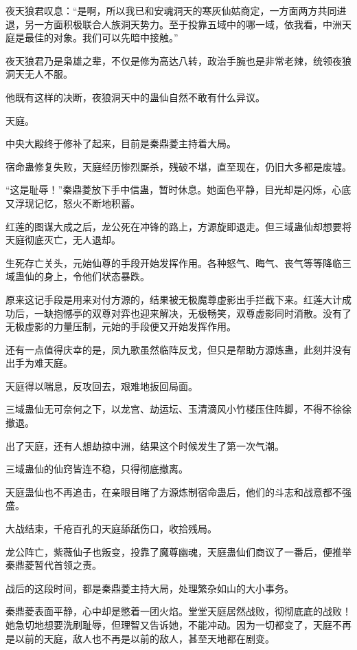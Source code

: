 \begin{this_body}
夜天狼君叹息：“是啊，所以我已和安魂洞天的寒灰仙姑商定，一方面两方共同进退，另一方面积极联合人族洞天势力。至于投靠五域中的哪一域，依我看，中洲天庭是最佳的对象。我们可以先暗中接触。”

夜天狼君乃是枭雄之辈，不仅是修为高达八转，政治手腕也是非常老辣，统领夜狼洞天无人不服。

他既有这样的决断，夜狼洞天中的蛊仙自然不敢有什么异议。

天庭。

中央大殿终于修补了起来，目前是秦鼎菱主持着大局。

宿命蛊修复失败，天庭经历惨烈厮杀，残破不堪，直至现在，仍旧大多都是废墟。

“这是耻辱！”秦鼎菱放下手中信蛊，暂时休息。她面色平静，目光却是闪烁，心底又浮现记忆，怒火不断地积蓄。

红莲的图谋大成之后，龙公死在冲锋的路上，方源旋即退走。但三域蛊仙却想要将天庭彻底灭亡，无人退却。

生死存亡关头，元始仙尊的手段开始发挥作用。各种怒气、晦气、丧气等等降临三域蛊仙的身上，令他们状态暴跌。

原来这记手段是用来对付方源的，结果被无极魔尊虚影出手拦截下来。红莲大计成功后，一缺抱憾亭的双尊对弈也迎来解决，无极畅笑，双尊虚影同时消散。没有了无极虚影的力量压制，元始的手段便又开始发挥作用。

还有一点值得庆幸的是，凤九歌虽然临阵反戈，但只是帮助方源炼蛊，此刻并没有出手为难天庭。

天庭得以喘息，反攻回去，艰难地扳回局面。

三域蛊仙无可奈何之下，以龙宫、劫运坛、玉清滴风小竹楼压住阵脚，不得不徐徐撤退。

出了天庭，还有人想劫掠中洲，结果这个时候发生了第一次气潮。

三域蛊仙的仙窍皆连不稳，只得彻底撤离。

天庭蛊仙也不再追击，在亲眼目睹了方源炼制宿命蛊后，他们的斗志和战意都不强盛。

大战结束，千疮百孔的天庭舔舐伤口，收拾残局。

龙公阵亡，紫薇仙子也叛变，投靠了魔尊幽魂，天庭蛊仙们商议了一番后，便推举秦鼎菱暂代首领之责。

战后的这段时间，都是秦鼎菱主持大局，处理繁杂如山的大小事务。

秦鼎菱表面平静，心中却是憋着一团火焰。堂堂天庭居然战败，彻彻底底的战败！她急切地想要洗刷耻辱，但理智又告诉她，不能冲动。因为一切都变了，天庭不再是以前的天庭，敌人也不再是以前的敌人，甚至天地都在剧变。


\end{this_body}
